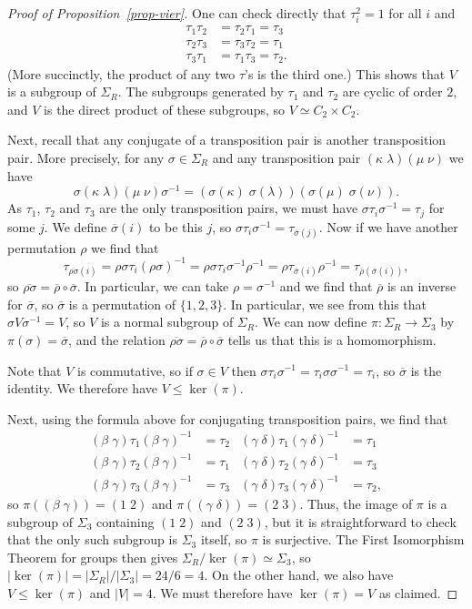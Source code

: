 \documentclass{amsart}
\newcommand{\bt}        {\beta}
\newcommand{\gm}        {\gamma}
\newcommand{\dl}        {\delta}
\newcommand{\kp}        {\kappa}
\newcommand{\lm}        {\lambda}
\newcommand{\sg}        {\sigma}
\newcommand{\Sg}        {\Sigma}
\newcommand{\ov}[1]     {\overline{#1}}
\newcommand{\tm}        {\times}
\renewcommand{\:}{\colon}
\theoremstyle{definition}
\begin{document}
\begin{proof}[Proof of Proposition~\ref{prop-vier}]
 One can check directly that $\tau_i^2=1$ for all $i$ and 
 \begin{align*}
  \tau_1\tau_2 &= \tau_2\tau_1 = \tau_3 \\
  \tau_2\tau_3 &= \tau_3\tau_2 = \tau_1 \\
  \tau_3\tau_1 &= \tau_1\tau_3 = \tau_2.
 \end{align*}
 (More succinctly, the product of any two $\tau$'s is the third one.)
 This shows that $V$ is a subgroup of $\Sg_R$.  The subgroups
 generated by $\tau_1$ and $\tau_2$ are cyclic of order $2$, and $V$
 is the direct product of these subgroups, so $V\simeq C_2\tm C_2$.

 Next, recall that any conjugate of a transposition pair is another
 transposition pair.  More precisely, for any $\sg\in\Sg_R$ and any
 transposition pair $(\kp\;\lm)(\mu\;\nu)$ we have
 \[ \sg(\kp\;\lm)(\mu\;\nu)\sg^{-1} = 
    (\sg(\kp)\;\sg(\lm))(\sg(\mu)\;\sg(\nu)).
 \]
 As $\tau_1$, $\tau_2$ and $\tau_3$ are the only transposition pairs,
 we must have $\sg\tau_i\sg^{-1}=\tau_j$ for some $j$.  We define
 $\ov{\sg}(i)$ to be this $j$, so
 $\sg\tau_i\sg^{-1}=\tau_{\ov{\sg}(j)}$.  Now if we have another
 permutation $\rho$ we find that
 \[ \tau_{\ov{\rho\sg}(i)} = \rho\sg\tau_i(\rho\sg)^{-1} = 
     \rho\sg\tau_i\sg^{-1}\rho^{-1} = \rho\tau_{\ov{\sg}(i)}\rho^{-1}
      = \tau_{\ov{\rho}(\ov{\sg}(i))},
 \] 
 so $\ov{\rho\sg}=\ov{\rho}\circ\ov{\sg}$.  In particular, we can take
 $\rho=\sg^{-1}$ and we find that $\ov{\rho}$ is an inverse for
 $\ov{\sg}$, so $\ov{\sg}$ is a permutation of $\{1,2,3\}$.  In
 particular, we see from this that $\sg V\sg^{-1}=V$, so $V$ is a
 normal subgroup of $\Sg_R$.  We can now define $\pi\:\Sg_R\to\Sg_3$
 by $\pi(\sg)=\ov{\sg}$, and the relation
 $\ov{\rho\sg}=\ov{\rho}\circ\ov{\sg}$ tells us that this is a
 homomorphism.

 Note that $V$ is commutative, so if $\sg\in V$ then
 $\sg\tau_i\sg^{-1}=\tau_i\sg\sg^{-1}=\tau_i$, so $\ov{\sg}$ is the
 identity.  We therefore have $V\leq\ker(\pi)$.
 
 Next, using the formula above for conjugating transposition pairs, we
 find that 
 \begin{align*}
  (\bt\;\gm) \tau_1 (\bt\;\gm)^{-1} &= \tau_2 & 
  (\gm\;\dl) \tau_1 (\gm\;\dl)^{-1} &= \tau_1 \\ 
  (\bt\;\gm) \tau_2 (\bt\;\gm)^{-1} &= \tau_1 & 
  (\gm\;\dl) \tau_2 (\gm\;\dl)^{-1} &= \tau_3 \\ 
  (\bt\;\gm) \tau_3 (\bt\;\gm)^{-1} &= \tau_3 & 
  (\gm\;\dl) \tau_3 (\gm\;\dl)^{-1} &= \tau_2, 
 \end{align*}
 so $\pi((\bt\;\gm))=(1\;2)$ and $\pi((\gm\;\dl))=(2\;3)$.  Thus, the
 image of $\pi$ is a subgroup of $\Sg_3$ containing $(1\;2)$ and
 $(2\;3)$, but it is straightforward to check that the only such
 subgroup is $\Sg_3$ itself, so $\pi$ is surjective.  The First
 Isomorphism Theorem for groups then gives
 $\Sg_R/\ker(\pi)\simeq\Sg_3$, so
 $|\ker(\pi)|=|\Sg_R|/|\Sg_3|=24/6=4$.  On the other hand, we also
 have $V\leq\ker(\pi)$ and $|V|=4$.  We must therefore have
 $\ker(\pi)=V$ as claimed.
\end{proof}
\end{document}
